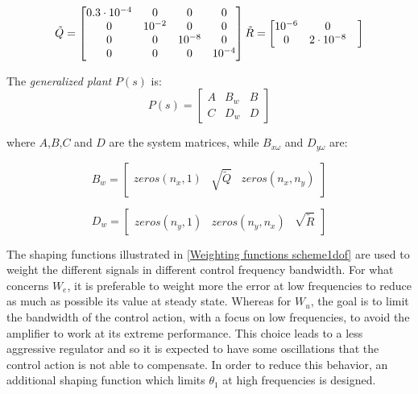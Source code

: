 \begin{equation}
	\tilde{Q}=
	\begin{bmatrix}
		0.3 \cdot 10^{-4} & 0 & 0 & 0 \\
		0 & 10^{-2} & 0 & 0 \\
		0 & 0 & 10^{-8} & 0 \\
		0 & 0 & 0 & 10^{-4}
	\end{bmatrix}
	\\
	\tilde{R}=
	\begin{bmatrix}
		10^{-6} & 0\\
		0 & 2\cdot10^{-8} & 
	\end{bmatrix}	
\end{equation}

The \textit{generalized plant} $P(s)$ is:
\begin{equation}
	P(s)
	=
	\left[
	\begin{array}{c|cc}
		A & B_{w} & B \\
		\hline
		C & D_{w} & D	
	\end{array}
	\right]
\label{P(s)}
\end{equation}

where $A$,$B$,$C$ and $D$ are the system matrices, while $B_{\dot{x}\omega}$ and $D_{y\omega}$ are:

\begin{equation}
	B_{w}=
	\begin{bmatrix}
		zeros(n_x,1) & \sqrt{\tilde{Q}} & zeros (n_x,n_y)
	\end{bmatrix}
\end{equation}

\begin{equation}
	D_{w}=
	\begin{bmatrix}
		zeros(n_y,1) & zeros (n_y,n_x) & \sqrt{\tilde{R}}
	\end{bmatrix}
\end{equation}

The shaping functions illustrated in \ref{Weighting functions scheme1dof} are used to weight the different signals in different control frequency bandwidth. 
For what concerns $W_e$, it is preferable to weight more the error at low frequencies to reduce as much as possible its value at steady state. Whereas for $W_u$, the goal is to limit the bandwidth of the control action, with a focus on low frequencies, to avoid the amplifier to  work at its extreme performance. This choice leads to a less aggressive regulator and so it is expected to have some oscillations that the control action is not able to compensate. In order to reduce this behavior, an additional shaping function which limits $\theta_{1}$ at high frequencies is designed.

